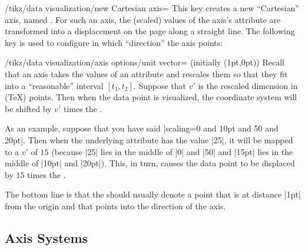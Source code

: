 \begin{key}{/tikz/data visualization/new Cartesian axis=}
    This key creates a new ``Cartesian'' axis, named . For such an
    axis, the (scaled) values of the axis's attribute are transformed into a
    displacement on the page along a straight line. The following key is used
    to configure in which ``direction'' the axis points:
    \begin{key}{/tikz/data visualization/axis options/unit vector= (initially {(1pt,0pt)})}
        Recall that an axis takes the values of an attribute and rescales them
        so that they fit into a ``reasonable'' interval $[t_1,t_2]$. Suppose
        that $v'$ is the rescaled dimension in (\TeX) points. Then when the
        data point is visualized, the coordinate system will be shifted by $v'$
        times the .

        As an example, suppose that you have said
        |scaling=0 and 10pt and 50 and 20pt|. Then when the underlying
        attribute has the value |25|, it will be mapped to a $v'$ of $15$
        (because |25| lies in the middle of |0| and |50| and |15pt| lies in the
        middle of |10pt| and |20pt|). This, in turn, causes the data point to
        be displaced by $15$ times the .

        The bottom line is that the  should usually denote a
        point that is at distance |1pt| from the origin and that points into
        the direction of the axis.
\begin{codeexample}[preamble={\usetikzlibrary{datavisualization}}]
\end{codeexample}
    \end{key}
\end{key}


\subsection{Axis Systems}
\label{section-dv-axis-systems}


